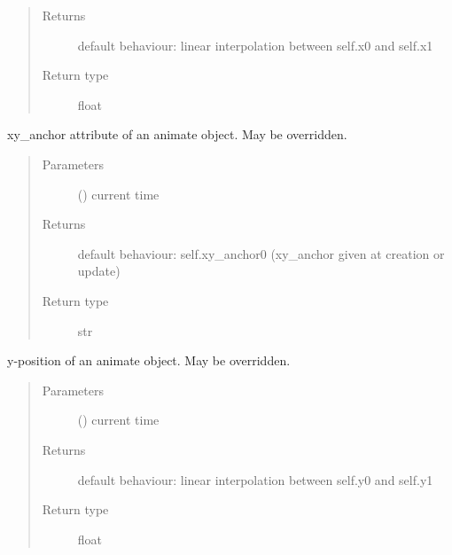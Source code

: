 \documentclass[letterpaper,10pt,english]{sphinxmanual}
\begin{document}
\begin{fulllineitems}
\begin{fulllineitems}
\begin{quote}
\begin{description}
\item[{Returns}] \leavevmode
{} \textendash{} default behaviour: linear interpolation between self.x0 and self.x1

\item[{Return type}] \leavevmode
float

\end{description}\end{quote}

\end{fulllineitems}


\begin{fulllineitems}
\label{\detokenize{Reference:salabim.Animate.xy_anchor}}
xy\_anchor attribute of an animate object. May be overridden.
\begin{quote}\begin{description}
\item[{Parameters}] \leavevmode
{} () \textendash{} current time

\item[{Returns}] \leavevmode
{} \textendash{} default behaviour: self.xy\_anchor0 (xy\_anchor given at creation or update)

\item[{Return type}] \leavevmode
str

\end{description}\end{quote}

\end{fulllineitems}


\begin{fulllineitems}
\label{\detokenize{Reference:salabim.Animate.y}}
y-position of an animate object. May be overridden.
\begin{quote}\begin{description}
\item[{Parameters}] \leavevmode
{} () \textendash{} current time

\item[{Returns}] \leavevmode
{} \textendash{} default behaviour: linear interpolation between self.y0 and self.y1

\item[{Return type}] \leavevmode
float

\end{description}\end{quote}

\end{fulllineitems}


\end{fulllineitems}
\end{document}
